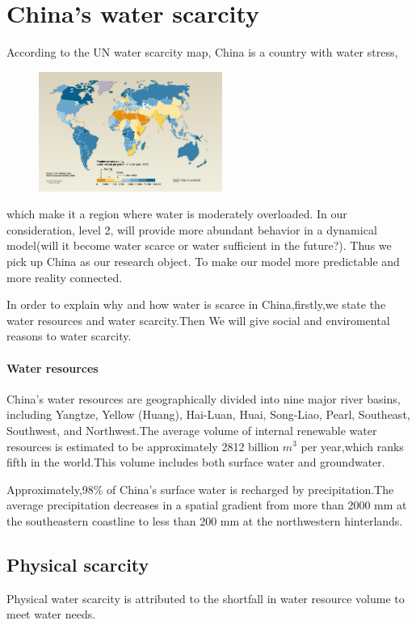 \section{China's water scarcity}
  According to the UN water scarcity map\cite{WaterScarcityMap}, China is a country with water stress,
  \begin{figure}
  \includegraphics[width = 6cm]{picture/WaterScarcityMap.jpg}
  \end{figure}
  which make it a region where water is moderately overloaded. In our consideration, level 2, will provide more abundant behavior in a dynamical model(will it become water scarce or water sufficient in the future?). Thus we pick up China as our research object. To make our model more predictable and more reality connected.

  In order to explain why and how water is scarce in China,firstly,we state the water resources and water scarcity.Then We will give social and enviromental reasons to water scarcity.

\paragraph{Water resources}
China’s water resources are geographically divided into nine major river basins, including Yangtze, Yellow (Huang), Hai-Luan, Huai, Song-Liao, Pearl, Southeast, Southwest, and Northwest.The average volume of internal renewable water resources is estimated to be approximately 2812 billion $m^3$ per year,which ranks fifth in the world.This volume includes both surface water and groundwater.

Approximately,98\% of China's surface water is recharged by precipitation.The average precipitation decreases in a spatial gradient from more than 2000 mm at the southeastern coastline to less than 200 mm at the northwestern hinterlands.

\subsection{Physical scarcity}
Physical water scarcity is attributed to the shortfall in water resource volume to meet water needs.

